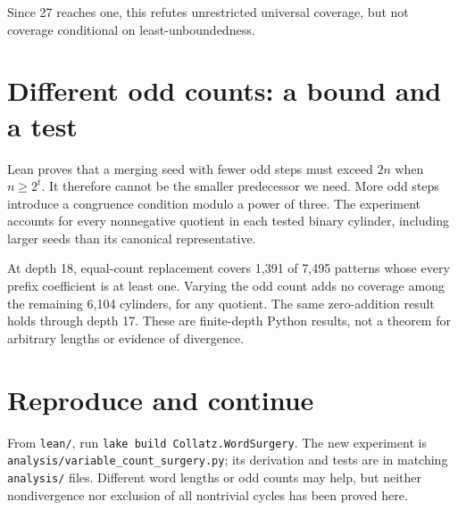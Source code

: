 \documentclass[10pt]{article}
\begin{document}
Since 27 reaches one, this refutes unrestricted universal coverage,
but not coverage conditional on least-unboundedness.

\section*{Different odd counts: a bound and a test}
Lean proves that a merging seed with fewer odd steps must exceed $2n$
when $n\geq2^t$. It therefore cannot be the smaller predecessor we need.
More odd steps introduce a congruence condition modulo a power of three.
The experiment accounts for every nonnegative quotient in each tested
binary cylinder, including larger seeds than its canonical representative.

At depth 18, equal-count replacement covers 1,391 of 7,495 patterns whose
every prefix coefficient is at least one. Varying the odd count adds no
coverage among the remaining 6,104 cylinders, for any quotient. The same
zero-addition result holds through depth 17. These are finite-depth Python
results, not a theorem for arbitrary lengths or evidence of divergence.

\section*{Reproduce and continue}
From \texttt{lean/}, run \texttt{lake build Collatz.WordSurgery}.
The new experiment is \texttt{analysis/variable\_count\_surgery.py};
its derivation and tests are in matching \texttt{analysis/} files.
Different word lengths or odd counts may help, but neither nondivergence
nor exclusion of all nontrivial cycles has been proved here.
\end{document}
